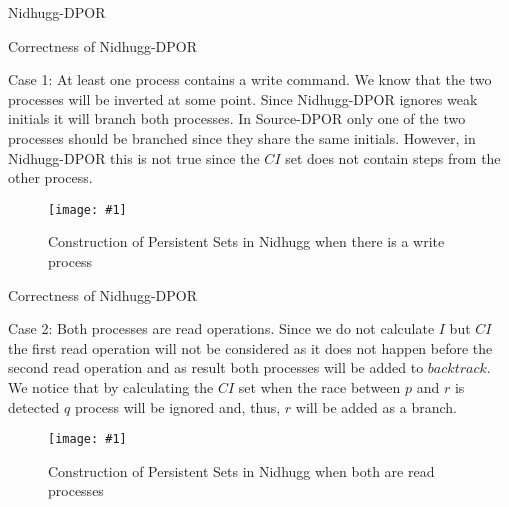 \documentclass[9pt]{beamer}
\newcommand{\trace}[2]{
\begin{figure}[H]
\centering
\texttt{[image: \#1]}
\caption{#2}
\label{#2}
\end{figure}
}
\begin{document}
\begin{frame}{Nidhugg-DPOR}
    
\begin{figure}
    
\end{figure}

\end{frame}

\begin{frame}{Correctness of Nidhugg-DPOR}


Case 1: At least one process contains a write command. We know that the two processes will be inverted at some
point. Since Nidhugg-DPOR ignores weak initials it will branch both processes. 
In Source-DPOR only one of the two processes should be branched since they share the same initials. 
However, in Nidhugg-DPOR this is not true since the $CI$ set does not contain steps from the other process.

\trace{../img/nidhuggpersistent1.pdf}{Construction of Persistent Sets in Nidhugg when there is a write process}

\end{frame}

\begin{frame}{Correctness of Nidhugg-DPOR}
    
Case 2: Both processes are read operations. Since we do not calculate $I$ but $CI$ the first read operation will not be
considered as it does not happen before the second read operation and as result both processes will be added to
$backtrack$.  We notice that by calculating the $CI$ set when the race between $p$ and $r$ is detected $q$ process will
be ignored and, thus, $r$ will be added as a branch.

\trace{../img/nidhuggpersistent.pdf}{Construction of Persistent Sets in Nidhugg when both are read processes}
    
\end{frame}
\end{document}
